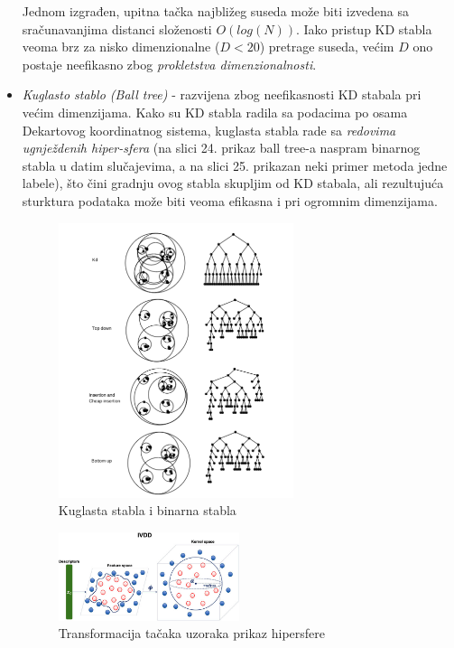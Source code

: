 \documentclass[fontsize=12bp, paper=a4]{scrarticle}
\begin{document}
\begin{itemize}
    Jednom izgrađen, upitna tačka najbližeg suseda može biti izvedena sa sračunavanjima distanci složenosti $O(log(N))$. Iako pristup KD stabla veoma brz za nisko dimenzionalne ($D < 20$) pretrage suseda, većim $D$ ono postaje neefikasno zbog \textit{prokletstva dimenzionalnosti}.

    
    \item \textit{Kuglasto stablo (Ball tree)} -    
    razvijena zbog neefikasnosti KD stabala pri većim dimenzijama. Kako su KD stabla radila sa podacima po osama Dekartovog koordinatnog sistema, kuglasta stabla rade sa \textit{redovima ugnježdenih hiper-sfera} (na slici 24. prikaz ball tree-a naspram binarnog stabla u datim slučajevima\cite{balltree}, a na slici 25. prikazan neki primer metoda jedne labele\cite{ivdd}), što čini gradnju ovog stabla skupljim od KD stabala, ali rezultujuća sturktura podataka može biti veoma efikasna i pri ogromnim dimenzijama. 
    \begin{figure}[h!]
        \centering
        \includegraphics[width=0.65\textwidth]{image-26.png}
        \caption{Kuglasta stabla i binarna stabla}
    \end{figure}
    
    \begin{figure}[h!]
        \centering
        \includegraphics[width=0.5\textwidth]{image-25.png}
        \caption{Transformacija tačaka uzoraka prikaz hipersfere}
    \end{figure}



\end{itemize}
\end{document}
